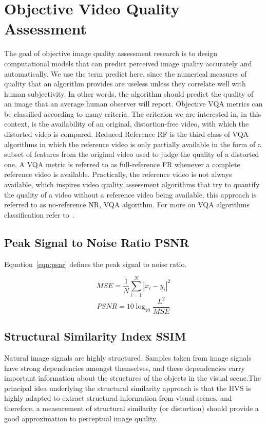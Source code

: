 \documentclass{article}
\begin{document}
\section{Objective Video Quality Assessment}
\label{sec:objective}
The goal of objective image quality assessment research is to design computational models that can predict perceived image quality accurately and automatically. We use the term predict here, since the numerical measures of quality that an algorithm provides are useless unless they correlate well with human subjectivity. In other words, the algorithm should predict the quality of an image that an average human observer will report.
Objective VQA metrics can be classified according to many criteria. The criterion we are interested in, in this context, is the availability of an original, distortion-free video, with which the distorted video is compared. Reduced Reference RF is the third class of VQA algorithms in which the reference video is only partially available in the form of a subset of features from the original video used to judge the quality of a distorted one. A VQA metric is referred to as full-reference FR whenever a complete reference video is available. Practically, the reference video is not always available, which inspires video quality assessment algorithms that try to quantify the quality of a video without a reference video being available, this approach is referred to as no-reference NR, VQA algorithm. For more on VQA algorithms classification refer to~\cite{wang2006}.

\subsection{Peak Signal to Noise Ratio PSNR}

Equation~\ref{eqn:psnr} defines the peak signal to noise ratio.

\begin{equation}
\label{eqn:mse}
   MSE =
   \frac {1}{N}{
        \sum_{i=1}^{N} |x_i-y_i|^2
    }
\end{equation}
\begin{equation}
\label{eqn:psnr}
  PSNR = 10
    \log_{10}{\frac{L^2}{MSE}}
\end{equation}
\subsection{Structural Similarity Index SSIM}
Natural image signals are highly structured. Samples taken from image signals have strong dependencies amongst themselves, and these dependencies carry important information about the structures of the objects in the visual scene.The principal idea underlying the structural similarity approach is that the HVS is highly adapted to extract structural information from visual scenes, and therefore, a measurement of structural similarity (or distortion) should provide a good approximation to perceptual image quality.
\end{document}
